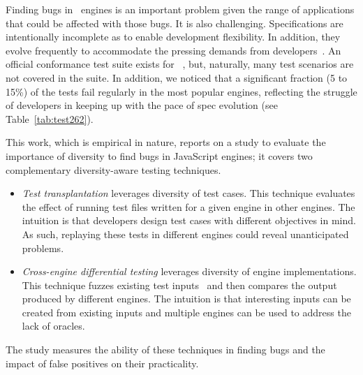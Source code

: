\documentclass[smallextended]{svjour3}
\begin{document}
Finding bugs in \js\ engines is an important problem given the range
of applications that could be affected with those bugs. It is also
challenging.  Specifications are intentionally incomplete as to enable
development flexibility. In addition, they evolve frequently to
accommodate the pressing demands from
developers~\cite{ecmas262-spec-repo}. An official conformance test
suite exists for \js~\cite{tc39-github}, but, naturally, many test
scenarios are not covered in the suite. In addition, we noticed that a
significant fraction (5 to 15\%) of the tests fail regularly in the
most popular engines, reflecting the struggle of developers in keeping
up with the pace of spec evolution (see Table~\ref{tab:test262}).

This work, which is empirical in nature, reports on a study to evaluate the importance of diversity
to find bugs in JavaScript engines; it covers two complementary
diversity-aware testing techniques.

\begin{itemize}[topsep=0pt,parsep=0pt,partopsep=2pt,labelwidth=0cm,align=left,itemindent=-0.25cm]
\item \emph{Test transplantation} leverages diversity of test
  cases. This technique evaluates the effect of running test files
  written for a given engine in other engines. The intuition is that
  developers design test cases with different objectives in mind. As
  such, replaying these tests in different engines could reveal
  unanticipated problems.

\item \emph{Cross-engine differential testing} leverages diversity of
  engine implementations. This technique fuzzes existing test
  inputs~\cite{fuzz-testing-history} and then compares the output
  produced by different engines. The intuition is that interesting inputs can be created
  from existing inputs and multiple engines can be used to address the
  lack of oracles.
\end{itemize}

The study measures the ability of these techniques in finding bugs and
the impact of false positives on their practicality.

\end{document}
